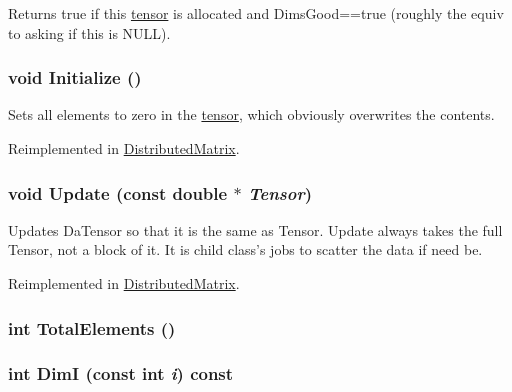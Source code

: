Returns true if this \hyperlink{classJKBuilder_1_1tensor}{tensor} is allocated and DimsGood==true (roughly the equiv to asking if this is NULL). \hypertarget{classJKBuilder_1_1tensor_a98b1050f09da390896f964fb7a892391}{
\subsubsection[{Initialize}]{\setlength{\rightskip}{0pt plus 5cm}void Initialize ()}}
\label{classJKBuilder_1_1tensor_a98b1050f09da390896f964fb7a892391}


Sets all elements to zero in the \hyperlink{classJKBuilder_1_1tensor}{tensor}, which obviously overwrites the contents. 

Reimplemented in \hyperlink{classJKBuilder_1_1DistributedMatrix_a98b1050f09da390896f964fb7a892391}{DistributedMatrix}.\hypertarget{classJKBuilder_1_1tensor_a10ffea2bf428adfa3e8319646c44a3c6}{
\subsubsection[{Update}]{\setlength{\rightskip}{0pt plus 5cm}void Update (const double $\ast$ {\em Tensor})}}
\label{classJKBuilder_1_1tensor_a10ffea2bf428adfa3e8319646c44a3c6}


Updates DaTensor so that it is the same as Tensor. Update always takes the full Tensor, not a block of it. It is child class's jobs to scatter the data if need be. 

Reimplemented in \hyperlink{classJKBuilder_1_1DistributedMatrix_a6a378face23ba83b2431cb08e8519066}{DistributedMatrix}.\hypertarget{classJKBuilder_1_1tensor_a537b2f14296e2f0e62f00e1703c5fa08}{
\subsubsection[{TotalElements}]{\setlength{\rightskip}{0pt plus 5cm}int TotalElements ()}}
\label{classJKBuilder_1_1tensor_a537b2f14296e2f0e62f00e1703c5fa08}
\hypertarget{classJKBuilder_1_1tensor_a6bdcfca6493bc217b607317dbceb28b2}{
\subsubsection[{DimI}]{\setlength{\rightskip}{0pt plus 5cm}int DimI (const int {\em i}) const}}
\label{classJKBuilder_1_1tensor_a6bdcfca6493bc217b607317dbceb28b2}


